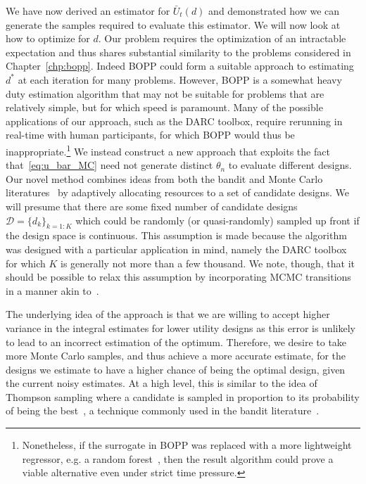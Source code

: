 We have now derived an estimator for $\bar{U}_t(d)$ and demonstrated how we can generate the
samples required to evaluate this estimator.  We will now look at how to optimize for $d$.  
Our problem requires the optimization of an intractable expectation and thus shares substantial
similarity to the problems considered in Chapter~\ref{chp:bopp}.  Indeed BOPP could form a suitable
approach to estimating $d^*$ at each iteration for many problems.  However, BOPP is a somewhat heavy
duty estimation algorithm that may not be suitable for problems that are relatively simple,
but for which speed is paramount.  Many of the possible applications of our approach, such
as the DARC toolbox, require rerunning in real-time with human participants, for which BOPP would
thus be inappropriate.\footnote{Nonetheless, if the surrogate in BOPP
	was replaced with a more lightweight regressor, e.g. a random forest~\cite{hutter2011sequential},
	then the result algorithm could prove a viable alternative even under strict time pressure.}
We instead construct a new approach
that exploits the fact that~\eqref{eq:u_bar_MC} need not generate distinct $\theta_n$ to evaluate
different designs.  Our novel method combines ideas from both the bandit and
Monte Carlo literatures~\citep{amzal2006bayesian,neufeld2014adaptive} by adaptively 
allocating resources to a set of candidate designs.  We will presume that there are some fixed number 
of candidate designs $\mathcal{D} = \{d_k\}_{k=1:K}$ which could be randomly (or quasi-randomly)
sampled up front if the design space is continuous.  This assumption is made because the 
algorithm was designed with a particular application in mind, namely the DARC toolbox for which $K$
is generally not more than a few thousand.  We note, though, that it should be possible to relax this
assumption by incorporating MCMC transitions in a manner akin to~\citep{amzal2006bayesian}.

The underlying idea of the approach is that we are willing to accept higher variance in the integral estimates for lower utility designs as this error is unlikely to lead to an incorrect estimation of the optimum.
Therefore, we desire to take more Monte Carlo samples, and thus achieve a more accurate estimate, for the designs we estimate to have a higher chance of being the optimal design, given the current noisy estimates.
At a high level, this is similar  to the idea of Thompson sampling
where a candidate is sampled in proportion to its probability of being the best~\citep{thompson1933likelihood}, 
a technique commonly used in the bandit literature~\citep{agrawal2012analysis}.


